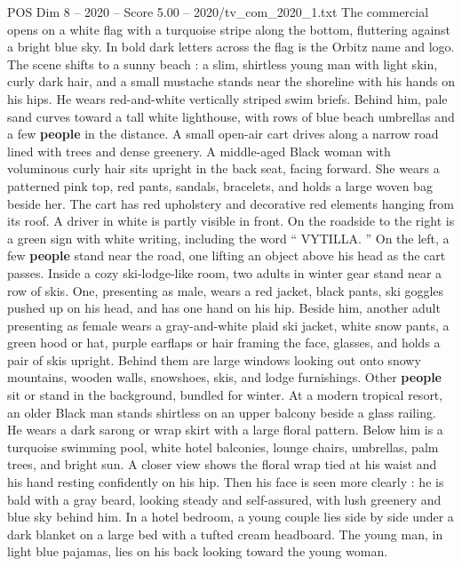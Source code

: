 \begin{textsample}{POS Dim 8 – 2020 – Score 5.00 – 2020/tv\_com\_2020\_1.txt}  \label{ex:f8_pos_059}
The commercial opens on a white flag with a turquoise stripe along the bottom, fluttering against a bright blue sky.
In bold dark letters across the flag is the Orbitz name and logo.
The scene shifts to a sunny beach : a slim, shirtless young man with light skin, curly dark hair, and a small mustache stands near the shoreline with his hands on his hips.
He wears red-and-white vertically striped swim briefs.
Behind him, pale sand curves toward a tall white lighthouse, with rows of blue beach umbrellas and a few \textbf{people} in the distance.
A small open-air cart drives along a narrow road lined with trees and dense greenery.
A middle-aged Black woman with voluminous curly hair sits upright in the back seat, facing forward.
She wears a patterned pink top, red pants, sandals, bracelets, and holds a large woven bag beside her.
The cart has red upholstery and decorative red elements hanging from its roof.
A driver in white is partly visible in front.
On the roadside to the right is a green sign with white writing, including the word “ VYTILLA. ” On the left, a few \textbf{people} stand near the road, one lifting an object above his head as the cart passes.
Inside a cozy ski-lodge-like room, two adults in winter gear stand near a row of skis.
One, presenting as male, wears a red jacket, black pants, ski goggles pushed up on his head, and has one hand on his hip.
Beside him, another adult presenting as female wears a gray-and-white plaid ski jacket, white snow pants, a green hood or hat, purple earflaps or hair framing the face, glasses, and holds a pair of skis upright.
Behind them are large windows looking out onto snowy mountains, wooden walls, snowshoes, skis, and lodge furnishings.
Other \textbf{people} sit or stand in the background, bundled for winter.
At a modern tropical resort, an older Black man stands shirtless on an upper balcony beside a glass railing.
He wears a dark sarong or wrap skirt with a large floral pattern.
Below him is a turquoise swimming pool, white hotel balconies, lounge chairs, umbrellas, palm trees, and bright sun.
A closer view shows the floral wrap tied at his waist and his hand resting confidently on his hip.
Then his face is seen more clearly : he is bald with a gray beard, looking steady and self-assured, with lush greenery and blue sky behind him.
In a hotel bedroom, a young couple lies side by side under a dark blanket on a large bed with a tufted cream headboard.
The young man, in light blue pajamas, lies on his back looking toward the young woman.

\end{textsample}

